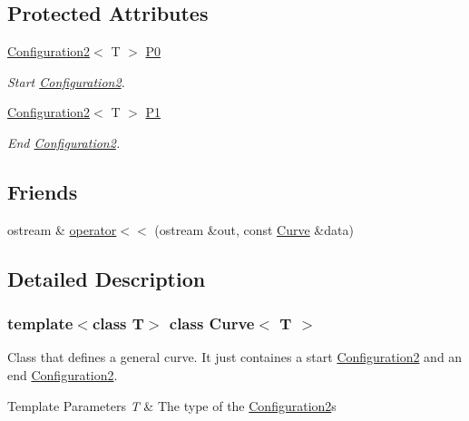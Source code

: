 \subsection*{Protected Attributes}
\begin{DoxyCompactItemize}
\item 
\mbox{\hyperlink{class_configuration2}{Configuration2}}$<$ T $>$ \mbox{\hyperlink{class_curve_a3a549faa5e4b5990da5d5cf67940fe24}{P0}}
\begin{DoxyCompactList}\small\item\em Start {\ttfamily \mbox{\hyperlink{class_configuration2}{Configuration2}}}. \end{DoxyCompactList}\item 
\mbox{\hyperlink{class_configuration2}{Configuration2}}$<$ T $>$ \mbox{\hyperlink{class_curve_ab9eb1cded523a8de01c4514a4bf9e748}{P1}}
\begin{DoxyCompactList}\small\item\em End {\ttfamily \mbox{\hyperlink{class_configuration2}{Configuration2}}}. \end{DoxyCompactList}\end{DoxyCompactItemize}
\subsection*{Friends}
\begin{DoxyCompactItemize}
\item 
ostream \& \mbox{\hyperlink{class_curve_a91af4d37d8aec484114b20623c07058b}{operator$<$$<$}} (ostream \&out, const \mbox{\hyperlink{class_curve}{Curve}} \&data)
\end{DoxyCompactItemize}


\subsection{Detailed Description}
\subsubsection*{template$<$class T$>$\newline
class Curve$<$ T $>$}

Class that defines a general curve. It just containes a start {\ttfamily \mbox{\hyperlink{class_configuration2}{Configuration2}}} and an end {\ttfamily \mbox{\hyperlink{class_configuration2}{Configuration2}}}. 
\begin{DoxyTemplParams}{Template Parameters}
{\em T} & The type of the {\ttfamily \mbox{\hyperlink{class_configuration2}{Configuration2}}}s \\
\hline
\end{DoxyTemplParams}


